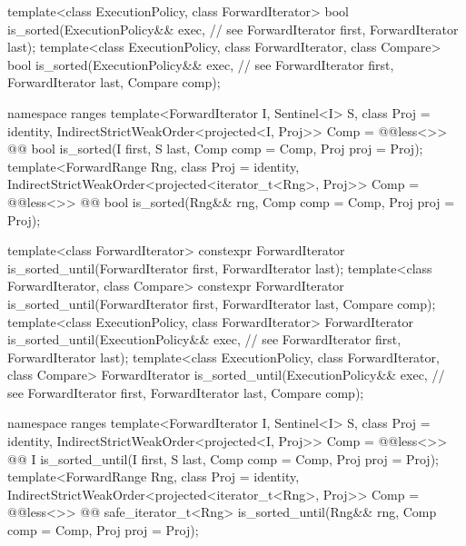 \begin{codeblock}
  template<class ExecutionPolicy, class ForwardIterator>
    bool is_sorted(ExecutionPolicy&& exec, // see 
                   ForwardIterator first, ForwardIterator last);
  template<class ExecutionPolicy, class ForwardIterator, class Compare>
    bool is_sorted(ExecutionPolicy&& exec, // see 
                   ForwardIterator first, ForwardIterator last,
                   Compare comp);
\end{codeblock}\begin{addedblock}\begin{codeblock}
  namespace ranges {
    template<ForwardIterator I, Sentinel<I> S, class Proj = identity,
        IndirectStrictWeakOrder<projected<I, Proj>> Comp = @@less<>>
      @@ bool is_sorted(I first, S last, Comp comp = Comp{}, Proj proj = Proj{});
    template<ForwardRange Rng, class Proj = identity,
        IndirectStrictWeakOrder<projected<iterator_t<Rng>, Proj>> Comp = @@less<>>
      @@ bool is_sorted(Rng&& rng, Comp comp = Comp{}, Proj proj = Proj{});
  }
\end{codeblock}\end{addedblock}\begin{codeblock}
  template<class ForwardIterator>
    constexpr ForwardIterator
      is_sorted_until(ForwardIterator first, ForwardIterator last);
  template<class ForwardIterator, class Compare>
    constexpr ForwardIterator
      is_sorted_until(ForwardIterator first, ForwardIterator last,
                      Compare comp);
  template<class ExecutionPolicy, class ForwardIterator>
    ForwardIterator
      is_sorted_until(ExecutionPolicy&& exec, // see 
                      ForwardIterator first, ForwardIterator last);
  template<class ExecutionPolicy, class ForwardIterator, class Compare>
    ForwardIterator
      is_sorted_until(ExecutionPolicy&& exec, // see 
                      ForwardIterator first, ForwardIterator last,
                      Compare comp);
\end{codeblock}\begin{addedblock}\begin{codeblock}
  namespace ranges {
    template<ForwardIterator I, Sentinel<I> S, class Proj = identity,
        IndirectStrictWeakOrder<projected<I, Proj>> Comp = @@less<>>
      @@ I is_sorted_until(I first, S last, Comp comp = Comp{}, Proj proj = Proj{});
    template<ForwardRange Rng, class Proj = identity,
        IndirectStrictWeakOrder<projected<iterator_t<Rng>, Proj>> Comp = @@less<>>
      @@ safe_iterator_t<Rng>
        is_sorted_until(Rng&& rng, Comp comp = Comp{}, Proj proj = Proj{});
  }
\end{codeblock}\end{addedblock}\begin{codeblock}


\end{codeblock}
